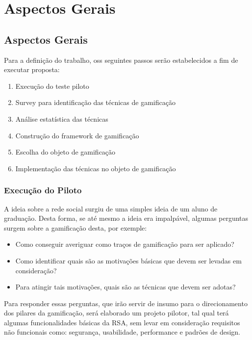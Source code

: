 \part{Aspectos Gerais}
\chapter[Aspectos Gerais]{Aspectos Gerais}

Para a definição do trabalho, oss seguintes
passos serão estabelecidos a fim de executar proposta:

\begin{enumerate}
    \item Execução do teste piloto
    \item Survey para identificação das técnicas de gamificação
    \item Análise estatística das técnicas
    \item Construção do framework de gamificação
    \item Escolha do objeto de gamificação
    \item Implementação das técnicas no objeto de gamificação
\end{enumerate}

\section{Execução do Piloto}
\label{sub:execu_o_do_piloto}
A ideia sobre a rede social surgiu de uma simples ideia de um aluno de graduação. Desta forma, se até mesmo a
ideia era impalpável, algumas perguntas surgem sobre a gamificação desta, por exemple:

\begin{itemize}
    \item Como conseguir averiguar como traços de gamificação para ser aplicado?
    \item Como identificar quais são as motivações básicas que devem ser levadas em consideração?
    \item Para atingir tais motivações, quais são as técnicas que devem ser adotas?
\end{itemize}

Para responder essas perguntas, que irão servir de insumo para o direcionamento dos pilares da gamificação, será elaborado um projeto pilotor, tal qual terá algumas funcionalidades básicas da RSA, sem levar em consideração requisitos não funcionais como: segurança, usabilidade, performance e padrões de design.

